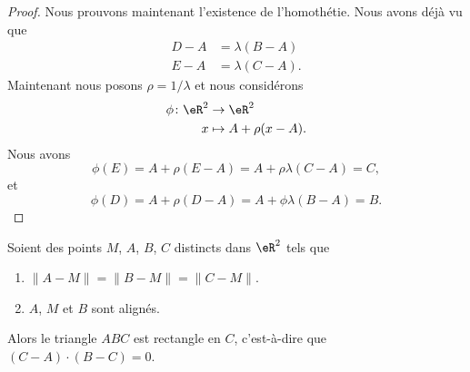 \begin{proof}
	Nous prouvons maintenant l'existence de l'homothétie. Nous avons déjà vu que
	\begin{subequations}
		\begin{align}
			D-A & =\lambda(B-A)  \\
			E-A & =\lambda(C-A).
		\end{align}
	\end{subequations}
	Maintenant nous posons \( \rho=1/\lambda\) et nous considérons
	\begin{equation}
		\begin{aligned}
			\phi\colon \eR^2 & \to \eR^2            \\
			x                & \mapsto A+\rho(x-A).
		\end{aligned}
	\end{equation}
	Nous avons
	\begin{equation}
		\phi(E)=A+\rho(E-A)=A+\rho\lambda(C-A)=C,
	\end{equation}
	et
	\begin{equation}
		\phi(D)=A+\rho(D-A)=A+\phi\lambda(B-A)=B.
	\end{equation}
\end{proof}

\begin{theorem}      \label{THOooGFTWooACQLFJ}
	Soient des points \( M\), \( A\), \( B\), \( C\) distincts dans \( \eR^2\) tels que
	\begin{enumerate}
		\item
		      \( \| A-M \|=\| B-M \|=\| C-M \|\).
		\item
		      \( A\), \( M\) et \( B\) sont alignés.
	\end{enumerate}
	Alors le triangle \( ABC\) est rectangle en \( C\), c'est-à-dire que \( (C-A)\cdot(B-C)=0\).
\end{theorem}

